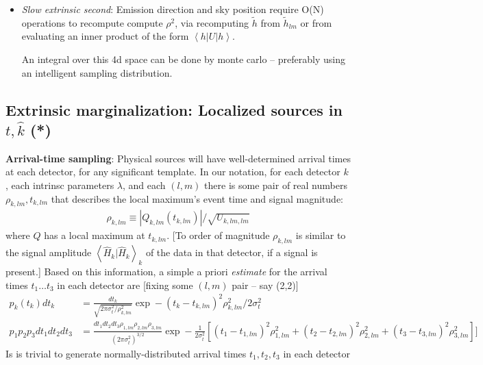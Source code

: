 \documentclass[twocolumn,prd,nofootinbib]{revtex4}
\newcommand\qmstateproduct[2]{\left\langle#1|#2\right\rangle}
\newcommand\qmoperatorelement[3]{\left\langle#1\left|#2\right|#3\right\rangle}
\begin{document}
\begin{widetext}
{\begin{itemize}
\begin{shaded}
    Given these two terms, we compute an ``easy'' integral,
where every term in the integrand can be computed from a quick interpolation over a well-sampled, low-dimensional function:
\begin{eqnarray}
L_{red,EZ} \equiv \int \frac{dt}{T_{\rm window}} \frac{d\psi}{\pi} \frac{dr}{r_{\rm max}^3/3}e^{\ln  L}
\end{eqnarray}
\end{shaded}

\item \emph{Slow extrinsic second}: Emission direction and sky position require O(N) operations to recompute compute
  $\rho^2$, via recomputing $\tilde{h}$ from $\tilde{h}_{lm}$ or from evaluating an inner product of the form
  $\qmoperatorelement{h}{U}{h}$.    

An integral over this 4d space can be done by monte carlo -- preferably using an intelligent sampling distribution.

\end{itemize}
}




\subsection{Extrinsic marginalization: Localized sources in $t,\hat{k}$ (*)}

\noindent \textbf{Arrival-time sampling}: Physical sources will have well-determined arrival times at each detector,
for any significant template.  In our notation, for each detector $k$, each intrinsc parameters $\lambda$, and each
$(l,m)$ there is some pair of real numbers $\rho_{k,lm},t_{k,lm}$  that describes the local maximum's event time and
signal magnitude:
\begin{eqnarray}
\rho_{k,lm} \equiv |Q_{k,lm}(t_{k,lm})|/\sqrt{U_{k,lm,lm}}
\end{eqnarray}
where $Q$ has a local maximum at $t_{k,lm}$.  
[To order of magnitude $\rho_{k,lm}$ is similar to the signal amplitude $\qmstateproduct{\hat{H}_k}{\hat{H}_k}_k$ of the
data in that detector, if a signal is present.]
%
Based on this information, a simple a priori \emph{estimate} for the arrival times $t_1\ldots t_3$ in each detector are
[fixing some $(l,m)$ pair -- say (2,2)]
\begin{align}
p_k(t_k) dt_k &= \frac{dt_k}{\sqrt{2\pi  \sigma_t^2/\rho_{k,lm}^2}} \exp - (t_k - t_{k,lm})^2 \rho_{k,lm}^2/2\sigma_t^2 \\
p_1 p_2 p_3 dt_1 dt_2 dt_3 &= \frac{dt_1 dt_2 dt_3 \rho_{1,lm}\rho_{2,lm}\rho_{3,lm}}{(2\pi \sigma_t^2)^{3/2}}
 \exp - \frac{1}{2\sigma_t^2}\left[ (t_1 - t_{1,lm})^2 \rho_{1,lm}^2 + (t_2 - t_{2,lm})^2 \rho_{2,lm}^2 + (t_3 -
   t_{3,lm})^2 \rho_{3,lm}^2 \right]]
\end{align}
Is is trivial to generate normally-distributed  arrival times $t_1,t_2,t_3$ in each detector


\end{widetext}
\end{document}
